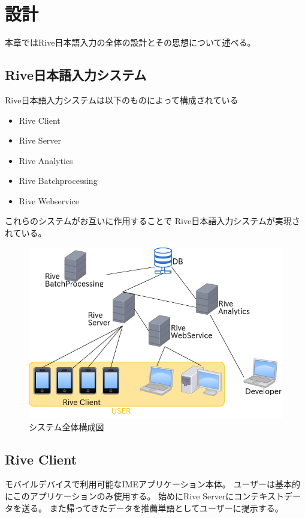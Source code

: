 \chapter{設計}
\label{chap:design}
本章ではRive日本語入力の全体の設計とその思想について述べる。

\newpage
\section{Rive日本語入力システム}
Rive日本語入力システムは以下のものによって構成されている
\begin{itemize}
  \item Rive Client
  \item Rive Server
  \item Rive Analytics
  \item Rive Batchprocessing
  \item Rive Webservice
\end{itemize}
これらのシステムがお互いに作用することで
Rive日本語入力システムが実現されている。
\begin{figure}[htbp]
  \begin{center}
    \includegraphics[width=12cm,bb=0 0 540 448]{images/systemstructure.png}
  \end{center}
  \caption{システム全体構成図}
  \label{fig:systemstructure}
\end{figure}

\section{Rive Client}
モバイルデバイスで利用可能なIMEアプリケーション本体。
ユーザーは基本的にこのアプリケーションのみ使用する。
始めにRive Serverにコンテキストデータを送る。
また帰ってきたデータを推薦単語としてユーザーに提示する。

